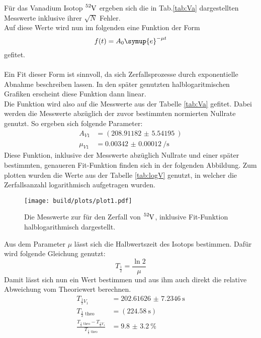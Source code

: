 \noindent
Für das Vanadium Isotop $\ce{^{52}_{}V}$ ergeben sich die in Tab.\ref{tab:Va} dargestellten Messwerte inklusive ihrer $\sqrt{N}$ Fehler.\\
Auf diese Werte wird nun im folgenden eine Funktion der Form
\begin{equation}
    f(t)= A_0 \symup{e}^{-\mu t}
    \label{eqn:fit}
\end{equation}
gefitet.\\\\
\noindent
Ein Fit dieser Form ist sinnvoll, da sich Zerfallsprozesse durch exponentielle Abnahme beschreiben lassen. 
In den später genutzten halblogaritmischen Grafiken erscheint diese Funktion dann linear.\\
Die Funktion wird also auf die Messwerte aus der Tabelle \ref{tab:Va} gefitet. 
Dabei werden die Messwerte abzüglich der zuvor bestimmten normierten Nullrate genutzt.
So ergeben sich folgende Parameter:
\begin{align*}
    A_{V1}&=(\SI{208.91182(554195)}{})\\
    \mu_{V1}&=\SI{0.00342(12)}{\per\second}
\end{align*}
\newline
\noindent
Diese Funktion, inklusive der Messwerte abzüglich Nullrate und einer später bestimmten, genaueren Fit-Funktion finden sich in der folgenden Abbildung.
Zum plotten wurden die Werte aus der Tabelle \ref{tab:logV} genutzt, in welcher die Zerfallsanzahl logarithmisch aufgetragen wurden.
\begin{figure}[H]
    \centering
    \texttt{[image: build/plots/plot1.pdf]}
    \caption{Die Messwerte zur für den Zerfall von $\ce{^{52}_{}V}$, inklusive Fit-Funktion halblogarithmisch dargestellt.}
    \label{img:V}
\end{figure}
\noindent
Aus dem Parameter $\mu$ lässt sich die Halbwertszeit des Isotops bestimmen. Dafür wird folgende Gleichung genutzt:
\begin{equation}
    T_{\frac{1}{2}}=\frac{\ln{2}}{\mu}
    \label{eqn:halb}
\end{equation}
Damit lässt sich nun ein Wert bestimmen und aus ihm auch direkt die relative Abweichung vom Theoriewert\cite{Vanadium} berechnen.
\begin{align*}
    T_{\frac{1}{2}V_1}&= \SI{202.61626(723460)}{\second}  \\
    T_{\frac{1}{2}\text{ theo}}&=(\SI{224.58}{\second}) \\
    \frac{T_{\frac{1}{2}\text{ theo}}-T_{\frac{1}{2}V_1}}{T_{\frac{1}{2}\text{ theo}}}&=\SI{9.8(32)}{\percent}
\end{align*}

